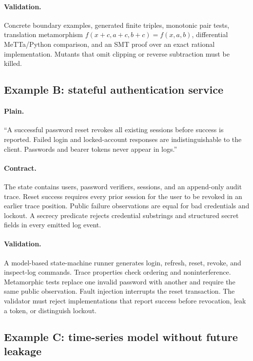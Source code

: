 \documentclass[10pt]{article}
\begin{document}
\paragraph{Validation.}
Concrete boundary examples, generated finite triples, monotonic pair tests,
translation metamorphism $f(x+c,a+c,b+c)=f(x,a,b)$, differential MeTTa/Python
comparison, and an SMT proof over an exact rational implementation.  Mutants
that omit clipping or reverse subtraction must be killed.

\subsection{Example B: stateful authentication service}

\paragraph{Plain.}
``A successful password reset revokes all existing sessions before success is
reported.  Failed login and locked-account responses are indistinguishable to
the client.  Passwords and bearer tokens never appear in logs.''

\paragraph{Contract.}
The state contains users, password verifiers, sessions, and an append-only
audit trace.  Reset success requires every prior session for the user to be
revoked in an earlier trace position.  Public failure observations are equal
for bad credentials and lockout.  A secrecy predicate rejects credential
substrings and structured secret fields in every emitted log event.

\paragraph{Validation.}
A model-based state-machine runner generates login, refresh, reset, revoke,
and inspect-log commands.  Trace properties check ordering and noninterference.
Metamorphic tests replace one invalid password with another and require the
same public observation.  Fault injection interrupts the reset transaction.
The validator must reject implementations that report success before
revocation, leak a token, or distinguish lockout.

\subsection{Example C: time-series model without future leakage}
\end{document}
